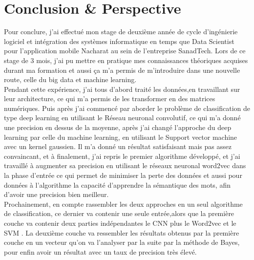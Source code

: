 \chapter*{Conclusion \& Perspective} %
Pour conclure, j’ai effectué mon stage de deuxième année de cycle d'ingénierie logiciel et intégration des systèmes informatique  en temps que Data Scientist pour l'application mobile Nacharat au sein de l’entreprise SanadTech. Lors de ce stage de 3 mois, j’ai pu mettre en pratique mes connaissances théoriques acquises durant ma formation et aussi ça m'a permis de m'introduire dans une nouvelle route, celle du big data et machine learning.\\[0.5cm]
Pendant cette expérience, j'ai tous d'abord traité les données,en travaillant sur leur architecture, ce qui m'a permis de les transformer en des matrices numériques. Puis après j'ai commencé par aborder le problème de classification  de type deep learning en utilisant le Réseau neuronal convolutif, ce qui m'a donné une precision en dessus de la moyenne, après j'ai  changé l'approche  du deep learning par celle  du machine learning, en utilisant le Support vector machine avec un kernel gaussien. Il m'a donné un résultat satisfaisant mais pas assez convaincant, et à finalement, j'ai repris le premier algorithme développé, et j'ai travaillé à augmenter sa precision en utilisant le réseaux neuronal word2vec dans la phase d'entrée ce qui permet de minimiser la perte des données et aussi pour données à l'algorithme la capacité d'apprendre la sémantique des mots, afin d'avoir une precision bien meilleur.\\[0.5cm]
Prochainement, en compte rassembler les deux approches en un seul algorithme de classification, ce dernier va contenir une seule entrée,alors que la première couche va contenir deux parties indépendantes le CNN plus le Word2vec et le SVM . La deuxième couche va ressembler les résultats obtenus par la première couche en un vecteur qu'on va l'analyser par la suite par la méthode de Bayes, pour enfin avoir un résultat avec un taux de precision très élevé.